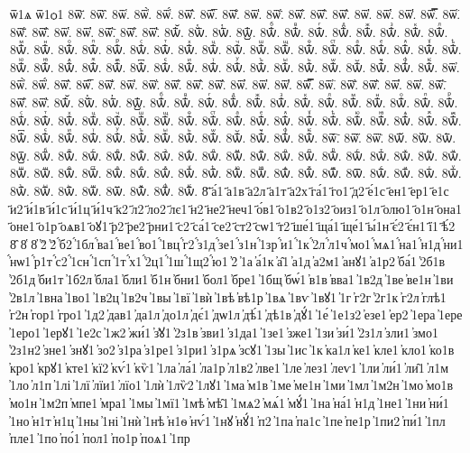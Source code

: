 {ѿ1ѧ
ѿ1ѻ1
8ѿ҃.
8ѿ҄.
8ѿ҅.
8ѿ҅̀.
8ѿ҅́.
8ѿ҅̂.
8ѿ҅̅.
8ѿ҅̆.
8ѿ҅̇.
8ѿ҅̈.
8ѿ҅̋.
8ѿ҅̏.
8ѿ҅̑.
8ѿ҅̓.
8ѿ҅̔.
8ѿ҅̾.
8ѿ҅̿.
8ѿ҅͘.
8ѿ҅҃.
8ѿ҅҄.
8ѿ҅҅.
8ѿ҅҆.
8ѿ҅҇.
8ѿ҅᷀.
8ѿ҅᷁.
8ѿ҅᷶.
8ѿ᷷҅.
8ѿ᷸҅.
8ѿ᷹҅.
8ѿ҅ⷠ.
8ѿ҅ⷡ.
8ѿ҅ⷢ.
8ѿ҅ⷣ.
8ѿ҅ⷤ.
8ѿ҅ⷥ.
8ѿ҅ⷦ.
8ѿ҅ⷧ.
8ѿ҅ⷨ.
8ѿ҅ⷩ.
8ѿ҅ⷪ.
8ѿ҅ⷫ.
8ѿ҅ⷬ.
8ѿ҅ⷭ.
8ѿ҅ⷮ.
8ѿ҅ⷯ.
8ѿ҅ⷰ.
8ѿ҅ⷱ.
8ѿ҅ⷲ.
8ѿ҅ⷳ.
8ѿ҅ⷴ.
8ѿ҅ⷵ.
8ѿ҅ⷶ.
8ѿ҅ⷷ.
8ѿ҅ⷸ.
8ѿ҅ⷹ.
8ѿ҅ⷺ.
8ѿ҅ⷻ.
8ѿ҅ⷼ.
8ѿ҅ⷽ.
8ѿ҅ⷾ.
8ѿ҅ⷿ.
8ѿ҅꙯.
8ѿ҅ꙴ.
8ѿ҅ꙵ.
8ѿ҅ꙶ.
8ѿ҅ꙷ.
8ѿ҅ꙸ.
8ѿ҅ꙹ.
8ѿ҅ꙺ.
8ѿ҅ꙻ.
8ѿ҅꙼.
8ѿ҅꙽.
8ѿ҅ꚞ.
8ѿ҅ꚟ.
8ѿ҆.
8ѿ҆̀.
8ѿ҆́.
8ѿ҆̂.
8ѿ҆̅.
8ѿ҆̆.
8ѿ҆̇.
8ѿ҆̈.
8ѿ҆̋.
8ѿ҆̏.
8ѿ҆̑.
8ѿ҆̓.
8ѿ҆̔.
8ѿ҆̾.
8ѿ҆̿.
8ѿ҆͘.
8ѿ҆҃.
8ѿ҆҄.
8ѿ҆҅.
8ѿ҆҆.
8ѿ҆҇.
8ѿ҆᷀.
8ѿ҆᷁.
8ѿ҆᷶.
8ѿ᷷҆.
8ѿ᷸҆.
8ѿ᷹҆.
8ѿ҆ⷠ.
8ѿ҆ⷡ.
8ѿ҆ⷢ.
8ѿ҆ⷣ.
8ѿ҆ⷤ.
8ѿ҆ⷥ.
8ѿ҆ⷦ.
8ѿ҆ⷧ.
8ѿ҆ⷨ.
8ѿ҆ⷩ.
8ѿ҆ⷪ.
8ѿ҆ⷫ.
8ѿ҆ⷬ.
8ѿ҆ⷭ.
8ѿ҆ⷮ.
8ѿ҆ⷯ.
8ѿ҆ⷰ.
8ѿ҆ⷱ.
8ѿ҆ⷲ.
8ѿ҆ⷳ.
8ѿ҆ⷴ.
8ѿ҆ⷵ.
8ѿ҆ⷶ.
8ѿ҆ⷷ.
8ѿ҆ⷸ.
8ѿ҆ⷹ.
8ѿ҆ⷺ.
8ѿ҆ⷻ.
8ѿ҆ⷼ.
8ѿ҆ⷽ.
8ѿ҆ⷾ.
8ѿ҆ⷿ.
8ѿ҆꙯.
8ѿ҆ꙴ.
8ѿ҆ꙵ.
8ѿ҆ꙶ.
8ѿ҆ꙷ.
8ѿ҆ꙸ.
8ѿ҆ꙹ.
8ѿ҆ꙺ.
8ѿ҆ꙻ.
8ѿ҆꙼.
8ѿ҆꙽.
8ѿ҆ꚞ.
8ѿ҆ꚟ.
8ѿ҇.
8ѿ᷀.
8ѿ᷁.
8ѿ᷶.
8ѿ᷷.
8ѿ᷸.
8ѿ᷹.
8ѿⷠ.
8ѿⷡ.
8ѿⷢ.
8ѿⷣ.
8ѿⷤ.
8ѿⷥ.
8ѿⷦ.
8ѿⷧ.
8ѿⷨ.
8ѿⷩ.
8ѿⷪ.
8ѿⷫ.
8ѿⷬ.
8ѿⷭ.
8ѿⷮ.
8ѿⷯ.
8ѿⷰ.
8ѿⷱ.
8ѿⷲ.
8ѿⷳ.
8ѿⷴ.
8ѿⷵ.
8ѿⷶ.
8ѿⷷ.
8ѿⷸ.
8ѿⷹ.
8ѿⷺ.
8ѿⷻ.
8ѿⷼ.
8ѿⷽ.
8ѿⷾ.
8ѿⷿ.
8ѿ꙯.
8ѿꙴ.
8ѿꙵ.
8ѿꙶ.
8ѿꙷ.
8ѿꙸ.
8ѿꙹ.
8ѿꙺ.
8ѿꙻ.
8ѿ꙼.
8ѿ꙽.
8ѿꚞ.
8ѿꚟ.
8҃
҃а́1
҃а1в
҃а2л
҃а1т
҃а2х
҃га́1
҃го1
҃д2
҃е́1с
҃ен1
҃ер1
҃е1с
҃и2
҃и́1в
҃и́1с
҃и́1ц
҃и́1ч
҃к2
҃л2
҃ло2
҃лє1
҃н2
҃не2
҃неч1
҃о́в1
҃о1в2
҃о1з2
҃оиз1
҃о1л
҃олю1
҃о1н
҃она1
҃оне1
҃о1р
҃оѧв1
҃оꙋ1
҃р2
҃ре2
҃рни1
҃с2
҃са́1
҃се2
҃ст2
҃сѡ1
҃т2
҃ше́1
҃ща́1
҃ще́1
҃ы́1н
҃є́2
҃є́н1
҃ї1
҃ѣ́2
8҄
8҅
8҆
҆2̀
҆2́
҆́б2
҆́1бл
҆́ва1
҆́ве1
҆́во1
҆́1вц
҆́г2
҆́з1д
҆́зе1
҆́з1н
҆́1зр
҆́и1
҆́1к
҆́2л
҆́л1ч
҆́мо1
҆́мѧ1
҆́на1
҆́н1д
҆́ни1
҆́нѡ1
҆́р1т
҆́с2
҆́1сн
҆́1сп
҆́1т
҆́х1
҆́2ц1
҆́1ш
҆́1щ2
҆́ю1
҆2̑
҆1а
҆а́1к
҆а̑1
҆а1д
҆а2м1
҆анꙋ1
҆а1р2
҆ба́1
҆2б1в
҆2б1д
҆би1т
҆1б2л
҆бла1
҆бли1
҆б1н
҆бни1
҆бол1
҆бре1
҆1бщ
҆бѡ́1
҆в1в
҆вва1
҆1в2д
҆1ве
҆ве1н
҆1ви
҆2в1л
҆1вна
҆1во1
҆1в2ц
҆1в2ч
҆1вы
҆1вї
҆1вѝ
҆1вѣ
҆вѣ1р
҆1вѧ
҆1вѵ
҆1вꙋ1
҆1г
҆г2г
҆2г1к
҆г2л
҆глѣ1
҆г2н
҆гор1
҆гро1
҆1д2
҆дав1
҆да1л
҆до1л
҆дє́1
҆дѡ1л
҆дѣ́1
҆дѣ1в
҆дꙋ́1
҆1е́
҆1е1з2
҆езе1
҆ер2
҆1ера
҆1ере
҆1еро1
҆1ерꙋ1
҆1е2с
҆1ж2
҆жи́1
҆з̾ꙋ1
҆2з1в
҆зви1
҆з1да1
҆1зе1
҆зже1
҆1зи
҆зи́1
҆2з1л
҆зли1
҆змо1
҆2з1н2
҆зне1
҆знꙋ1
҆зо2
҆з1ра
҆з1ре1
҆з1ри1
҆з1рѧ
҆зсꙋ1
҆1зы
҆1ис
҆1к
҆ка1л
҆ке1
҆кле1
҆кло1
҆ко1в
҆кро1
҆крꙋ1
҆кте1
҆кї2
҆кѵ́1
҆кѷ1
҆1ла
҆ла́1
҆ла1р
҆л1в2
҆лве1
҆1ле
҆лез1
҆леѵ1
҆1ли
҆ли́1
҆ли̑1
҆л1м
҆1ло
҆л1п
҆1лі
҆1лї
҆лїи1
҆лїо1
҆1лѝ
҆1лѷ2
҆1лꙋ1
҆1ма
҆м1в
҆1ме
҆ме1н
҆1ми
҆1мл
҆1м2н
҆1мо
҆мо1в
҆мо1н
҆1м2п
҆мпе1
҆мра1
҆1мы
҆1мї1
҆1мѣ
҆мѣ̑1
҆1мѧ2
҆мѧ́1
҆мꙋ́1
҆1на
҆на́1
҆н1д
҆1не1
҆1ни
҆ни́1
҆1но
҆н1т
҆н1ц
҆1ны
҆1ні
҆1нѝ
҆1нѣ
҆н1ѳ
҆нѵ́1
҆1нꙋ
҆нꙋ́1
҆п2
҆1па
҆па1с
҆1пе
҆пе1р
҆1пи2
҆пи́1
҆1пл
҆пле1
҆1по
҆по́1
҆пол1
҆по1р
҆поѧ1
҆1пр
}
